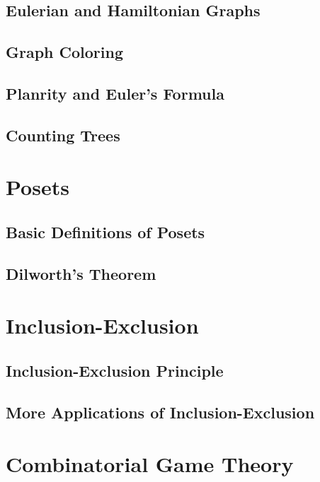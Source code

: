 \documentclass{book}
\begin{document}
\chapter{Eulerian and Hamiltonian Graphs}


\chapter{Graph Coloring}


\chapter{Planrity and Euler's Formula}


\chapter{Counting Trees}


\part{Posets}

\chapter{Basic Definitions of Posets}


\chapter{Dilworth's Theorem}


\part{Inclusion-Exclusion}

\chapter{Inclusion-Exclusion Principle}


\chapter{More Applications of Inclusion-Exclusion}


\part{Combinatorial Game Theory}

\backmatter




\printindex
\end{document}
